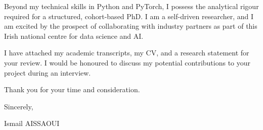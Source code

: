 \documentclass[11pt,a4paper]{article}
\begin{document}
Beyond my technical skills in Python and PyTorch, I possess the analytical rigour required for a structured, cohort-based PhD. I am a self-driven researcher, and I am excited by the prospect of collaborating with industry partners as part of this Irish national centre for data science and AI.

I have attached my academic transcripts, my CV, and a research statement for your review. I would be honoured to discuss my potential contributions to your project during an interview.

Thank you for your time and consideration.

Sincerely,

\bigskip

\noindent Ismail AISSAOUI
\end{document}
